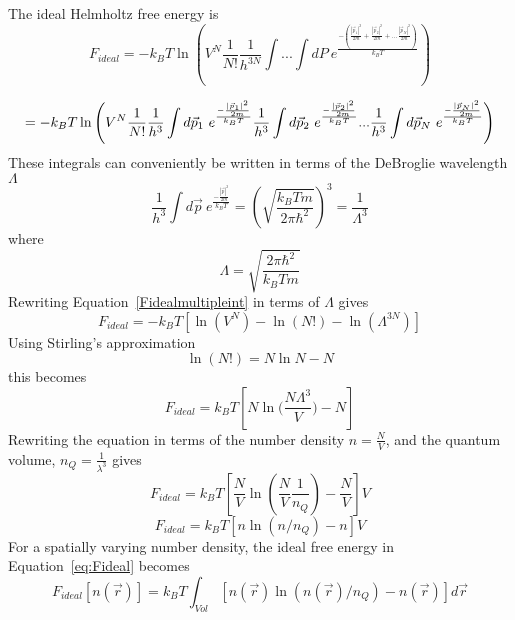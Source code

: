 \documentclass[12pt]{article}
\begin{document}
The ideal Helmholtz free energy is
\begin{displaymath}{F_{ideal}=-k_BT\ln{\left(V^N\frac{1}{N!}\frac{1}{h^{3N}}\int{...}\int{dP}~e^\frac{-(\frac{|\vec{p}_1|^2}{2m}+ \frac{|\vec{p}_2|^2}{2m}+...\frac{|\vec{p}_N|^2}{2m})}{k_BT}\right)}}\end{displaymath}  

\begin{equation}{\label{Fidealmultipleint}}{=-k_BT\ln\left(V^N\frac{1}{N!}\frac{1}{h^{3}}\int{d\vec{p}_1}~e^\frac{-\frac{|\vec{p}_1|^2}{2m}}{k_BT}\frac{1}{h^{3}}\int{d\vec{p}_2}~e^\frac{-\frac{|\vec{p}_2|^2}{2m}}{k_BT}{...}\frac{1}{h^{3}}\int{d\vec{p}_N}~e^\frac{-\frac{|\vec{p}_N|^2}{2m}}{k_BT}\right)}\end{equation}
These integrals can conveniently be written in terms of the DeBroglie wavelength $\Lambda$
\begin{equation}{\frac{1}{h^{3}}\int{d\vec{p}}~e^\frac{-\frac{|\vec{p}|^2}{2m}}{k_BT}=\left(\sqrt{\frac{k_BTm}{2\pi\hbar^2}}\right)^3=\frac{1}{\Lambda^{3}}}\end{equation} 
where \begin{equation}{\Lambda =\sqrt{\frac{2\pi\hbar^2}{k_BTm}}}\end{equation} 
Rewriting Equation~\ref{Fidealmultipleint} in terms of $\Lambda$ gives
\begin{equation}{F_{ideal}= -k_BT[\ln(V^N)-\ln(N!) - \ln(\Lambda^{3N})]}\end{equation}Using Stirling's approximation \begin{displaymath}{\ln(N!)=N\ln{N}-N}\end{displaymath} this becomes
\begin{equation}{F_{ideal}= k_BT[N\ln(\frac{N\Lambda^{3}}{V}{)-N}]}\end{equation} 
Rewriting the equation in terms of the number density $n=\frac{N}{V}$, and the quantum volume, $n_Q=\frac{1}{\lambda^3}$ gives
\begin{equation}{F_{ideal}= k_BT\left[\frac{N}{V}\ln{\left(\frac{N}{V}\frac{1}{n_Q}\right)}-\frac{N}{V}\right]}V\end{equation}
\begin{equation}{F_{ideal}= k_BT[n\ln(n/n_Q)-n]V}\label{eq:Fideal}\end{equation}   
For a spatially varying number density, the ideal free energy in Equation~\ref{eq:Fideal} becomes
\begin{equation}{F_{ideal}[n(\vec{r})]= k_BT\int_{Vol}[n(\vec{r})\ln(n(\vec{r})/n_Q)-n(\vec{r})]d\vec{r}}\end{equation} 
\end{document}
